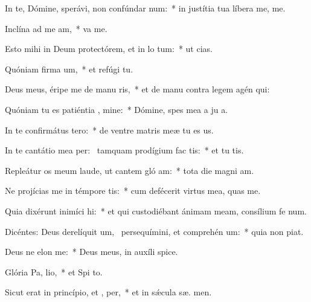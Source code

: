 \item In te, Dómine, sperávi, non confúndar  num:~* in justítia tua líbera me,   me.
\item Inclína ad me  am,~*  va me.
\item Esto mihi in Deum protectórem, et in lo tum:~* ut   cias.
\item Quóniam firma um,~* et refúgi   tu.
\item Deus meus, éripe me de manu ris,~* et de manu contra legem agén  qui:
\item Quóniam tu es patiéntia , mine:~* Dómine, spes mea a ju a.
\item In te confirmátus   tero:~* de ventre matris meæ tu es  us.
\item In te cantátio mea per:~\pscross{} tamquam prodígium fac  tis:~* et tu  tis.
\item Repleátur os meum laude, ut cantem gló am:~* tota die magni am.
\item Ne projícias me in témpore tis:~* cum defécerit virtus mea,  quas me.
\item Quia dixérunt inimíci  hi:~* et qui custodiébant ánimam meam, consílium fe  num.
\item Dicéntes: Deus derelíquit um,~\pscross{} persequímini, et comprehén um:~* quia non   piat.
\item Deus ne elon  me:~* Deus meus, in auxíli  spice.
\item Glória Pa,  lio,~* et Spi to.
\item Sicut erat in princípio, et ,  per,~* et in sǽcula sæ. men.
